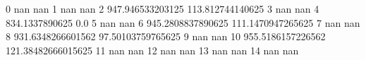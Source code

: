 0 nan nan
1 nan nan
2 947.946533203125 113.812744140625
3 nan nan
4 834.1337890625 0.0
5 nan nan
6 945.2808837890625 111.1470947265625
7 nan nan
8 931.6348266601562 97.50103759765625
9 nan nan
10 955.5186157226562 121.38482666015625
11 nan nan
12 nan nan
13 nan nan
14 nan nan
